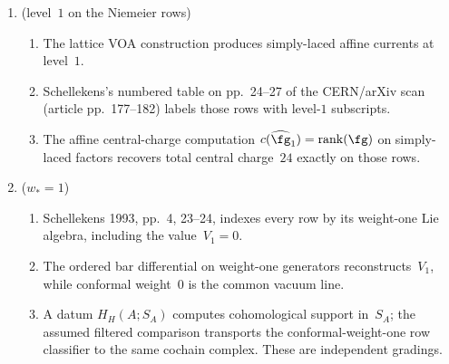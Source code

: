 \begin{remark}
\begin{enumerate}[label=\textup{(\arabic*)},leftmargin=*]
\begin{enumerate}[label=\textup{(\alph*)},leftmargin=*]
 \item It is the ambient hypothesis of Schellekens's classification.
 \item The lattice and Monster constructions compute
 $c=\operatorname{rank}(N)=24$ and $c(V^\natural)=24$ directly.
 \item The graded characters all begin with $q^{-1}$ and have modular
 weight~$0$, the holomorphic-$c=24$ normalization.
 \end{enumerate}
\item \textup{(}level~$1$ on the Niemeier rows\textup{)}
 \begin{enumerate}[label=\textup{(\alph*)},leftmargin=*]
 \item The lattice VOA construction produces simply-laced affine
 currents at level~$1$.
 \item Schellekens's numbered table on pp.~24--27 of the CERN/arXiv
 scan \textup{(}article pp.~177--182\textup{)} labels those rows
 with level-$1$ subscripts.
 \item The affine central-charge computation
 $c(\widehat{\fg}_{1})=\operatorname{rank}(\fg)$ on simply-laced
 factors recovers total central charge~$24$ exactly on those rows.
 \end{enumerate}
\item \textup{(}$w_\ast = 1$\textup{)}
 \begin{enumerate}[label=\textup{(\alph*)},leftmargin=*]
 \item Schellekens 1993, pp.~4, 23--24, indexes every row by its
 weight-one Lie algebra, including the value~$V_1=0$.
 \item The ordered bar differential on weight-one generators
 reconstructs~$V_1$, while conformal weight~$0$ is the common vacuum
 line.
 \item A datum $H_H(A;S_A)$ computes cohomological support in~$S_A$;
 the assumed filtered comparison transports the conformal-weight-one
 row classifier to the same cochain complex. These are independent
 gradings.
 \end{enumerate}
\end{enumerate}
\end{remark}


